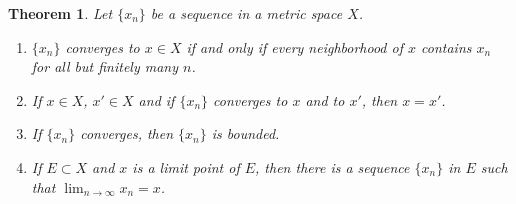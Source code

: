 \documentclass[10pt]{book}
\newtheorem{theorem}{Theorem}[chapter]
\theoremstyle{definition}
\numberwithin{equation}{chapter}
\begin{document}
\begin{theorem}\label{th_21}
Let $\{x_n\}$ be a sequence in a metric space $X$.
\begin{enumerate}[label=(\alph*)]
    \item $\{x_n\}$ converges to $x \in X$ if and only if every neighborhood of $x$ contains $x_n$ for all but finitely many $n$. \label{th_21_a}
    
    \item If $x \in X$, $x' \in X$ and if $\{x_n\}$ converges to $x$ and to $x'$, then $x = x'$. \label{th_21_b}
    
    \item If $\{x_n\}$ converges, then $\{x_n\}$ is bounded. \label{th_21_c}
    
    \item If $E \subset X$ and $x$ is a limit point of $E$, then there is a sequence $\{x_n\}$ in $E$ such that $\lim_{n\to\infty} x_n = x$. \label{th_21_d}
\end{enumerate}
\end{theorem}
\end{document}
